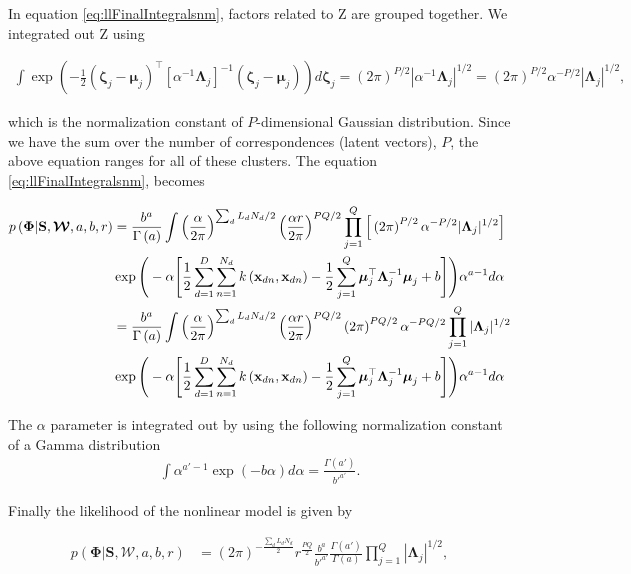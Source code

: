 \documentclass[]{article}
\newcommand{\kernel}[2]{k\left(#1,#2\right)}
\newcommand{\Z}{\boldsymbol{\mathrm{Z}}}
\newcommand{\C}{\boldsymbol{\Lambda}_j}
\newcommand{\muJ}{\boldsymbol{\mu}_j}
\newcommand{\gammaA}{\Gamma\left(a\right)}
\newcommand{\Scluster}{\mathbf{S}}
\newcommand{\W}{\boldsymbol{\mathcal{W}}}
\newcommand{\indobj}{\mathbf{x}_{dn}}
\newcommand{\lvec}{\boldsymbol{\zeta}_j}
\begin{document}
In equation \eqref{eq:llFinalIntegralsnm}, factors related to $\Z$ are grouped together. We integrated out $\Z$ using

\begin{align}
\int \exp\left(-\frac{1}{2}\left(\lvec-\muJ\right)^\top\left[\alpha^{-1}\C\right]^{-1}\left(\lvec-\muJ\right)\right)d\lvec = \left(2\pi\right)^{P/2}|\alpha^{-1}\C|^{1/2} = \left(2\pi\right)^{P/2}\alpha^{-P/2}|\C|^{1/2},
\end{align}

which is the normalization constant of $P$-dimensional Gaussian distribution. Since we have the sum over the number of correspondences (latent vectors), $P$, the above equation ranges for all of these clusters. The equation \eqref{eq:llFinalIntegralsnm}, becomes

\begin{align}
p\left(\boldsymbol{\Phi}|\Scluster,\W,a,b,r\right) &=\frac{b^a}{\gammaA}\int \left(\frac{\alpha}{2\pi}\right)^{\sum_d L_d N_d /2}\left(\frac{\alpha r}{2\pi}\right)^{PQ/2} \prod_{j=1}^{Q}\Big[\left(2\pi\right)^{P/2}\alpha^{-P/2}|\C|^{1/2}\Big]
 \notag\\
&\exp\Bigg(-\alpha\Bigg[\frac{1}{2} \sum_{d=1}^{D}\sum_{n=1}^{N_d}\kernel{\indobj}{\indobj} -\frac{1}{2}\sum_{j=1}^{Q}\muJ^\top\C^{-1}\muJ +b \Bigg]\Bigg)\alpha^{a-1}d\alpha \\
&=\frac{b^a}{\gammaA}\int \left(\frac{\alpha}{2\pi}\right)^{\sum_d L_d N_d /2}\left(\frac{\alpha r}{2\pi}\right)^{PQ/2} \left(2\pi\right)^{PQ/2}\alpha^{-PQ/2}\prod_{j=1}^{Q}|\C|^{1/2} \notag\\
&\exp\Bigg(-\alpha\Bigg[\frac{1}{2} \sum_{d=1}^{D}\sum_{n=1}^{N_d}\kernel{\indobj}{\indobj} -\frac{1}{2}\sum_{j=1}^{Q}\muJ^\top\C^{-1}\muJ +b \Bigg]\Bigg)\alpha^{a-1}d\alpha\label{eq:llFinalIntegralZnm}
\end{align}

The $\alpha$ parameter is integrated out by using the following normalization constant of a Gamma distribution 
\begin{align}
\int \alpha^{a'-1}\exp\left(-b\alpha\right)d\alpha = \frac{\Gamma\left(a'\right)}{b'^{a'}}.
\end{align}

Finally the likelihood of the nonlinear model is given by

\begin{align}
p\left(\boldsymbol{\Phi}|\Scluster,\W,a,b,r\right) &=\left(2\pi\right)^{-\frac{\sum_d L_d N_d}{2}}r^{\frac{PQ}{2}}\frac{b^{a}}{b'^{a'}}\frac{\Gamma\left(a'\right)}{\Gamma\left(a\right)}\prod_{j=1}^{Q}|\C|^{1/2},
\label{eq:llFinalIntegrallastnm}
\end{align}
\end{document}
